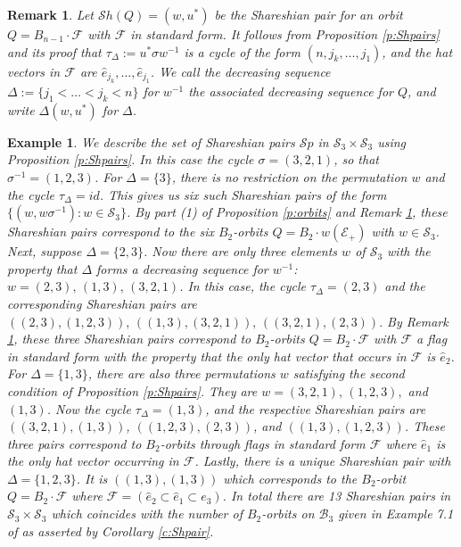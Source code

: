 \documentclass[12pt]{amsart}
\numberwithin{equation}{section}
\newtheorem{rem}[thm]{Remark}
\newtheorem{exam}[thm]{Example}
\newcommand{\B}{\mathcal{B}}
\newcommand{\he}{\hat{e}}
\newcommand{\F}{\mathcal{F}}
\newcommand{\Sh}{\mathcal{S}h}
\newcommand{\Sp}{\mathcal{S}p}
\begin{document}
\begin{rem}\label{r:whatisdelta}
Let $\Sh(Q)=(w, u^{*})$ be the Shareshian pair for an orbit $Q=B_{n-1}\cdot \F$ with $\F$ in standard form.  It follows from Proposition \ref{p:Shpairs} and its proof that  
$\tau_{\Delta}:=u^{*}\sigma w^{-1}$ is a cycle of the form $(n, j_{k},\dots, j_{1})$, and the hat vectors 
in $\F$ are $\he_{j_{k}},\dots, \he_{j_{1}}$. We call the decreasing sequence  $\Delta := \{j_{1}<\dots< j_{k}<n\}$ for $w^{-1}$ the \emph{associated decreasing sequence} for  $Q$, and write $\Delta(w,u^*)$ for $\Delta$.
\end{rem}

\begin{exam}
We describe the set of Shareshian pairs $\Sp$ in $\mathcal{S}_{3}\times\mathcal{S}_{3}$ using Proposition \ref{p:Shpairs}.  In this case the cycle $\sigma=(3,2,1)$, so that $\sigma^{-1}=(1,2,3)$.  For $\Delta=\{3\}$, there is no restriction on the permutation $w$ and the cycle $\tau_{\Delta}=id$.  This gives us six such Shareshian pairs of the form $\{(w, w\sigma^{-1}): w\in \mathcal{S}_{3}\}$.  By part (1) of Proposition \ref{p:orbits} and Remark \ref{r:whatisdelta}, these Shareshian pairs correspond to the six $B_{2}$-orbits $Q=B_{2}\cdot w(\mathcal{E}_{+})$ with $w\in\mathcal{S}_{3}$.   Next, suppose $\Delta=\{2,3\}$.  Now there are only three elements $w$ of $\mathcal{S}_{3}$ with the property that $\Delta$ forms a decreasing sequence for $w^{-1}$:  $w=(2,3),\, (1,3),\, (3,2,1)$.  In this case, the cycle $\tau_{\Delta}=(2,3)$ and the corresponding Shareshian pairs are $((2,3), (1,2,3)),\, ((1,3), (3,2,1)), \, ((3,2,1), (2,3)).$  By Remark \ref{r:whatisdelta}, these three Shareshian pairs correspond to $B_{2}$-orbits $Q=B_{2}\cdot \F$ with $\F$ a flag in standard form with the property that the only hat vector that occurs in $\F$ is $\hat{e}_{2}$.    For $\Delta=\{1,3\}$,  there are also three permutations $w$ satisfying the second condition of Proposition \ref{p:Shpairs}.  They are $w=(3,2,1), \, (1,2,3),$ and $(1,3)$.  Now the cycle $\tau_{\Delta}=(1,3)$, and the respective Shareshian pairs are $((3,2,1), (1,3))$, $((1,2,3), (2,3))$, and $((1,3), (1,2,3))$.  These three pairs correspond to $B_{2}$-orbits through flags in standard form $\F$ where $\hat{e}_{1}$ is the only hat vector occurring in $\F$.  Lastly, there is a unique Shareshian pair with $\Delta=\{1,2, 3\}$.  It is $((1,3), (1,3))$ which corresponds to the $B_{2}$-orbit $Q=B_{2}\cdot \F$ where $\F=(\hat{e}_{2}\subset \hat{e}_{1}\subset e_{3})$.   In total there are 13 Shareshian pairs in $\mathcal{S}_{3}\times\mathcal{S}_{3}$ which coincides with the number of $B_{2}$-orbits on $\B_{3}$ given in Example 7.1 of \cite{CE21II} as asserted by Corollary \ref{c:Shpair}. 

\end{exam}
\end{document}
